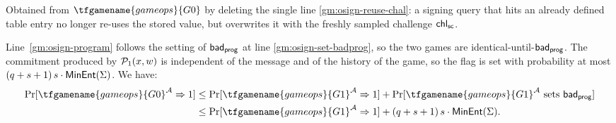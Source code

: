 Obtained from $\tfgamename{gameops}{G0}$ by deleting the single line \ref{gm:osign-reuse-chal}: a signing query that hits an already defined table entry no longer re-uses the stored value, but overwrites it with the freshly sampled challenge $\mathsf{chl}_{\mathsf{sc}}$.

Line~\ref{gm:osign-program} follows the setting of $\mathsf{bad}_\mathsf{prog}$ at line \ref{gm:osign-set-badprog}, so the two games are identical-until-$\mathsf{bad}_\mathsf{prog}$. 
The commitment produced by $\mathcal{P}_1(x,w)$ is
independent of the message and of the history of the game, so the flag is set
with probability at most $(q + s + 1)\,s \cdot \mathsf{MinEnt}(\Sigma)$.
We have:
\begin{align}\label{eq:g0g1}
    \Pr[\tfgamename{gameops}{G0}^\adv \Rightarrow 1] 
    & \leq \Pr[\tfgamename{gameops}{G1}^\adv \Rightarrow 1] + \Pr[\tfgamename{gameops}{G1}^\adv \text{ sets } \badprog] \\
    & \leq \Pr[\tfgamename{gameops}{G1}^\adv \Rightarrow 1] + (\numRO + \numOSign + 1)\,\numOSign \cdot \minentropy{\Sigma}.
\end{align}
